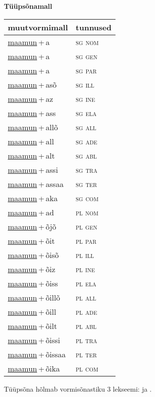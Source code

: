 
\vspace{1.8em}
\begin{minipage}{\textwidth}
\textbf{Tüüpsõnamall \,}\\

\begin{sideways}
\begin{tabular}{l l}
muutvormimall & tunnused \\
\hline
\underline{maamun}\,+\,a & \textsc{ sg nom } \\
\underline{maamun}\,+\,a & \textsc{ sg gen } \\
\underline{maamun}\,+\,a & \textsc{ sg par } \\
\underline{maamun}\,+\,asõ & \textsc{ sg ill } \\
\underline{maamun}\,+\,az & \textsc{ sg ine } \\
\underline{maamun}\,+\,ass & \textsc{ sg ela } \\
\underline{maamun}\,+\,allõ & \textsc{ sg all } \\
\underline{maamun}\,+\,all & \textsc{ sg ade } \\
\underline{maamun}\,+\,alt & \textsc{ sg abl } \\
\underline{maamun}\,+\,assi & \textsc{ sg tra } \\
\underline{maamun}\,+\,assaa & \textsc{ sg ter } \\
\underline{maamun}\,+\,aka & \textsc{ sg com } \\
\underline{maamun}\,+\,ad & \textsc{ pl nom } \\
\underline{maamun}\,+\,õjõ & \textsc{ pl gen } \\
\underline{maamun}\,+\,õit & \textsc{ pl par } \\
\underline{maamun}\,+\,õisõ & \textsc{ pl ill } \\
\underline{maamun}\,+\,õiz & \textsc{ pl ine } \\
\underline{maamun}\,+\,õiss & \textsc{ pl ela } \\
\underline{maamun}\,+\,õillõ & \textsc{ pl all } \\
\underline{maamun}\,+\,õill & \textsc{ pl ade } \\
\underline{maamun}\,+\,õilt & \textsc{ pl abl } \\
\underline{maamun}\,+\,õissi & \textsc{ pl tra } \\
\underline{maamun}\,+\,õissaa & \textsc{ pl ter } \\
\underline{maamun}\,+\,õika & \textsc{ pl com } \\
\end{tabular}
\end{sideways}
\label{tab:tüüpsõnamall-maamuna}

\end{minipage}

 
\vspace{1em}
\noindent Tüüpsõna hõlmab vormisõnastiku 3 lekseemi:  ja .

